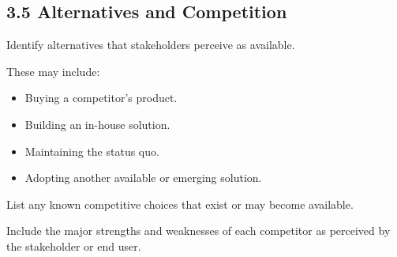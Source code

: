 \documentclass[12pt]{article}
\renewcommand{\baselinestretch}{1.5}
\begin{document}
\subsection*{3.5 Alternatives and Competition}
\par\medskip
Identify alternatives that stakeholders perceive as available.
\par\medskip
These may include:
\par\medskip
\begin{itemize}
\item Buying a competitor's product.
\par
\item Building an in-house solution.
\par
\item Maintaining the status quo.
\par
\item Adopting another available or emerging solution.
\par
\end{itemize}
List any known competitive choices that exist or may become available.
\par\medskip
Include the major strengths and weaknesses of each competitor as perceived by the stakeholder or end user.
\par\medskip
\begingroup
\scriptsize
\renewcommand{\baselinestretch}{1.0}\selectfont
\renewcommand{\arraystretch}{1.15}
\setlength{\tabcolsep}{4pt}
\end{document}
